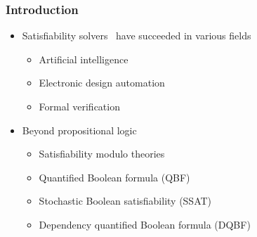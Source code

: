 \begin{frame}
      \frametitle{Introduction}
      \begin{itemize}
            \item Satisfiability solvers~\cite{SATHandbook} have succeeded in various fields
                  \pause
                  \begin{itemize}
                        \item Artificial intelligence~\cite{Nilsson2014,Russell2020}
                              \pause
                        \item Electronic design automation~\cite{Marques2000,Wang2009}
                              \pause
                        \item Formal verification~\cite{Berard2013,Jhala2009}
                  \end{itemize}
                  \pause
            \item Beyond propositional logic
                  \pause
                  \begin{itemize}
                        \item Satisfiability modulo theories~\cite{Moura2011,HBMC-SMT}
                              \pause
                        \item Quantified Boolean formula (QBF)~\cite{Narizzano2006,SATHandbook-QBF}
                              \pause
                        \item Stochastic Boolean satisfiability (SSAT)~\cite{Littman2001,SATHandbook-SSAT}
                              \pause
                        \item Dependency quantified Boolean formula (DQBF)~\cite{Balabanov2014,Scholl2018}
                  \end{itemize}
      \end{itemize}
\end{frame}

